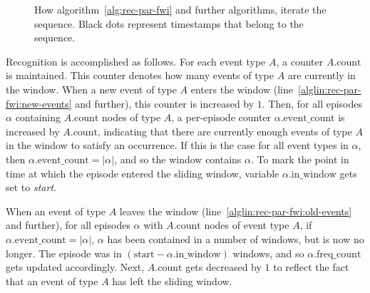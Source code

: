 \begin{figure}
\centering

\caption{How algorithm~\ref{alg:rec-par-fwi} and further algorithms, iterate the sequence. Black dots represent timestamps that belong to the sequence.}
\label{fig:sliding-window}
\end{figure}

Recognition is accomplished as follows. For each event type $ A $, a counter $ A \text{.count} $ is maintained. This counter denotes how many events of type $ A $ are currently in the window. When a new event of type $ A $ enters the window (line~\ref{alglin:rec-par-fwi:new-events} and further), this counter is increased by $ 1 $. Then, for all episodes $ \alpha $ containing $ A \text{.count} $ nodes of type $ A $, a per-episode counter $ \alpha \text{.event\_count} $ is increased by $ A \text{.count} $, indicating that there are currently enough events of type $ A $ in the window to satisfy an occurrence. If this is the case for all event types in $ \alpha $, then $ \alpha \text{.event\_count} = | \alpha | $, and so the window contains $ \alpha $. To mark the point in time at which the episode entered the sliding window, variable $ \alpha \text{.in\_window} $ gets set to \emph{start}.

When an event of type $ A $ leaves the window (line~\ref{alglin:rec-par-fwi:old-events} and further), for all episodes $ \alpha $ with $ A \text{.count} $ nodes of event type $ A $, if $ \alpha \text{.event\_count} = | \alpha | $, $ \alpha $ has been contained in a number of windows, but is now no longer. The episode was in $ (\text{start} - \alpha \text{.in\_window}) $ windows, and so $ \alpha \text{.freq\_count} $ gets updated accordingly. Next, $ A \text{.count} $ gets decreased by $ 1 $ to reflect the fact that an event of type $ A $ has left the sliding window.

